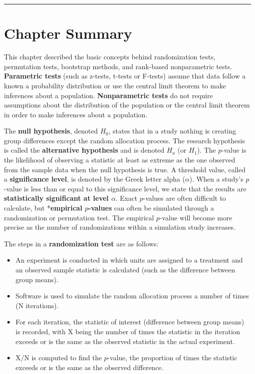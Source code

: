 \documentclass[
]{report}
\providecommand{\tightlist}{%
  \setlength{\itemsep}{0pt}\setlength{\parskip}{0pt}}
\begin{document}
\begin{center}\rule{0.5\linewidth}{0.5pt}\end{center}

\hypertarget{chapter-summary}{%
\section*{\texorpdfstring{\textbf{Chapter Summary}}{Chapter Summary}}\label{chapter-summary}}

This chapter described the basic concepts behind randomization tests, permutation tests, bootstrap methods, and rank-based nonparametric tests. \textbf{Parametric tests} (such as z-tests, t-tests or F-tests) assume that data follow a known a probability distribution or use the central limit theorem to make inferences about a population. \textbf{Nonparametric tests} do not require assumptions about the distribution of the population or the central limit theorem in order to make inferences about a population.

The \textbf{null hypothesis}, denoted \(H_0\), states that in a study nothing is creating group differences except the random allocation process. The research hypothesis is called the \textbf{alternative hypothesis} and is denoted \(H_a\) (or \(H_1\)). The \(p\)-value is the likelihood of observing a statistic at least as extreme as the one observed from the sample data when the null hypothesis is true. A threshold value, called a \textbf{significance level}, is denoted by the Greek letter alpha (\(\alpha\)). When a study's \(p\)-value is less than or equal to this significance level, we state that the results are \textbf{statistically significant at level \(\alpha\)}. Exact \(p\)-values are often difficult to calculate, but *\textbf{empirical \(p\)-values} can often be simulated through a randomization or permutation test. The empirical \(p\)-value will become more precise as the number of randomizations within a simulation study
increases.

The steps in a \textbf{randomization test} are as follows:

\begin{itemize}
\tightlist
\item
  An experiment is conducted in which units are assigned to a treatment and an observed sample statistic is calculated (such as the difference between group means).
\item
  Software is used to simulate the random allocation process a number of times (N iterations).
\item
  For each iteration, the statistic of interest (difference between group means) is recorded, with X being
  the number of times the statistic in the iteration exceeds or is the same as the observed statistic in the
  actual experiment.
\item
  X/N is computed to find the \(p\)-value, the proportion of times the statistic exceeds or is the same as the
  observed difference.
\end{itemize}
\end{document}
